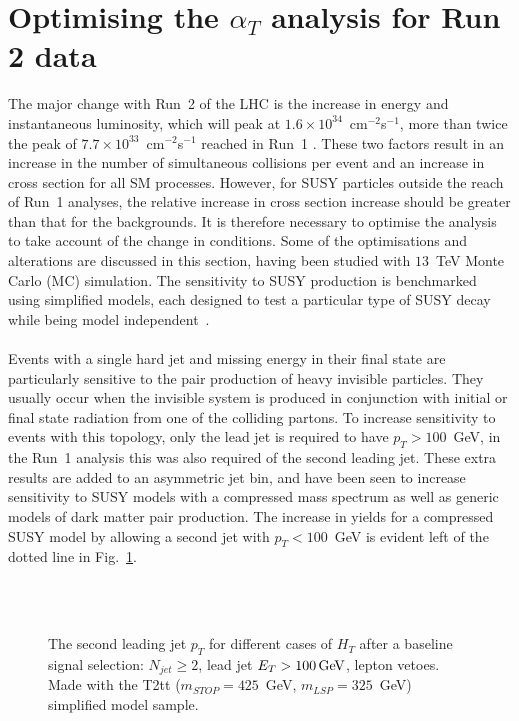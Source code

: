 
\section{Optimising the \boldmath $\alpha_T$ analysis for Run 2 data}
\label{sec:analysisOptimisation}

The major change with Run~2 of the LHC is the increase in energy and instantaneous luminosity, which will peak at $1.6\times10^{34}$~cm$^{-2}$s$^{-1}$, more than twice the peak of $7.7\times10^{33}$~cm$^{-2}$s$^{-1}$ reached in Run~1 \cite{LHCLuminosityIPAC13}. These two factors result in an increase in the number of simultaneous collisions per event and an increase in cross section for all SM processes. However, for SUSY particles outside the reach of Run~1 analyses, the relative increase in cross section increase should be greater than that for the backgrounds. It is therefore necessary to optimise the analysis to take account of the change in conditions. Some of the optimisations and alterations are discussed in this section, having been studied with $13$~TeV Monte Carlo (MC) simulation. The sensitivity to SUSY production is benchmarked using simplified models, each designed to test a particular type of SUSY decay while being model independent~\cite{SimplifiedModelsAlves:2011wf}.
\\\\
Events with a single hard jet and missing energy in their final state are particularly sensitive to the pair production of heavy invisible particles. They usually occur when the invisible system is produced in conjunction with initial or final state radiation from one of the colliding partons. To increase sensitivity to events with this topology, only the lead jet is required to have $p_T>100$~GeV, in the Run~1 analysis this was also required of the second leading jet. These extra results are added to an asymmetric jet bin, and have been seen to increase sensitivity to SUSY models with a compressed mass spectrum as well as generic models of dark matter pair production. The increase in yields for a compressed SUSY model by allowing a second jet with $p_T<100$~GeV is evident left of the dotted line in Fig.~\ref{fig:asymMotivation}.
\\\\
\begin{figure}[h!]
  \centering
  ~~
  \\
  \caption{\label{fig:asymMotivation} The second leading jet $p_T$ for different
  cases of $H_T$ after a baseline signal selection: $N_{jet}\geq2$, lead jet
  $E_T>100\mathrm{\,Ge\kern -0.1em V}$, lepton vetoes. Made with the T2tt ($m_{STOP}=425$~GeV, $m_{LSP}=325$~GeV) simplified model sample.}
\end{figure}

